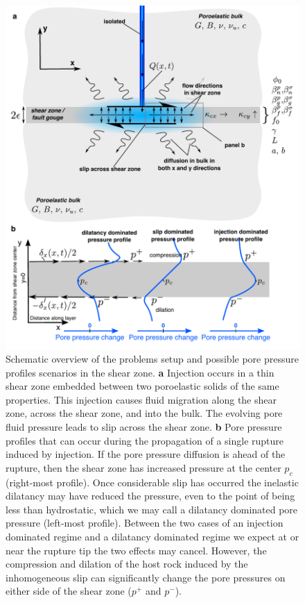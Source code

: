 \documentclass[draft]{agujournal2019}
\begin{document}
\begin{figure}[H]
\includegraphics[scale = 0.85]{Figures/schema2.pdf} %
\caption{Schematic overview of the problems setup and possible pore pressure profiles scenarios in the shear zone. {\bf a} Injection occurs in a thin shear zone embedded between two poroelastic solids of the same properties. This injection causes fluid migration along the shear zone, across the shear zone, and into the bulk. The evolving pore fluid pressure leads to slip across the shear zone. {\bf b} Pore pressure profiles that can occur during the propagation of a single rupture induced by injection. If the pore pressure diffusion is ahead of the rupture, then the shear zone has increased pressure at the center $p_c$ (right-most profile). Once considerable slip has occurred the inelastic dilatancy may have reduced the pressure, even to the point of being less than hydrostatic, which we may call a dilatancy dominated pore pressure (left-most profile). Between the two cases of an injection dominated regime and a dilatancy dominated regime we expect at or near the rupture tip the two effects may cancel. However, the compression and dilation of the host rock induced by the inhomogeneous slip can significantly change the pore pressures on either side of the shear zone ($p^+$ and $p^-$).}
\label{fig:schema}
\end{figure}
\end{document}
